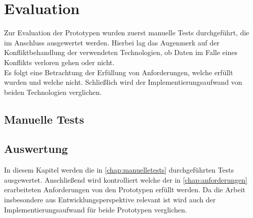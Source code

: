 \chapter{\label{chap:evaluation}Evaluation}
Zur Evaluation der Prototypen wurden zuerst manuelle Tests durchgeführt, die im Anschluss ausgewertet werden. 
Hierbei lag das Augenmerk auf der Konfliktbehandlung der verwendeten Technologien, ob Daten im Falle eines Konflikts verloren gehen oder nicht.\\
Es folgt eine Betrachtung der Erfüllung von Anforderungen, welche erfüllt wurden und welche nicht.
Schließlich wird der Implementierungsaufwand von beiden Technologien verglichen.
%
%
\section{\label{chap:manuelletests}Manuelle Tests}

%
%
\section{\label{chap:auswertung}Auswertung}
In diesem Kapitel werden die in \autoref{chap:manuelletests} durchgeführten Tests ausgewertet.
Anschließend wird kontrolliert welche der in \autoref{chap:anforderungen} erarbeiteten Anforderungen von den Prototypen erfüllt werden.
Da die Arbeit insbesondere aus Entwicklungsperspektive relevant ist wird auch der Implementierungsaufwand für beide Prototypen verglichen.
